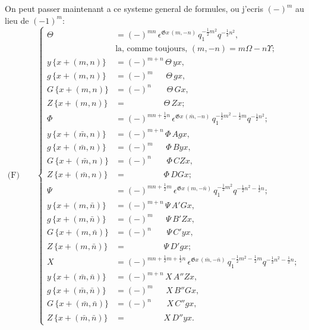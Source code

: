\documentclass[11pt,a4paper]{article}
\begin{document}
On peut passer maintenant a ce systeme general de formules, ou j'ecris $(-)^m$ au
lieu de $(-1)^m$:
\begin{equation*}
\text{(F)}\qquad
\left\{
\begin{aligned}
\Theta &= (-)^{mn}\, \epsilon^{\mathfrak{G}x\, (m, -n)}\, q_1^{-\frac{1}{2}m^2} q^{-\frac{1}{2}n^2},\\
&\text{la, comme toujours, } (m, -n) = m\Omega - n\Upsilon;\\
y\, \{x + (m, n)\} &= (-)^{m+n}\, \Theta\, yx,\\
g\, \{x + (m, n)\} &= (-)^m \phantom{+n}\, \Theta\, gx,\\
G\, \{x + (m, n)\} &= (-)^n \phantom{+m}\, \Theta\, Gx,\\
Z\, \{x + (m, n)\} &= \phantom{(-)^{m+n}} \Theta\, Zx;\\
\Phi &= (-)^{mn+\frac{1}{2}n}\, \epsilon^{\mathfrak{G}x\, (\bar{m}, -n)}\, q_1^{-\frac{1}{2}m^2 - \frac{1}{2}m} q^{-\frac{1}{2}n^2};\\
y\, \{x + (\bar{m}, n)\} &= (-)^{m+n}\, \Phi\, Agx,\\
g\, \{x + (\bar{m}, n)\} &= (-)^m \phantom{+n}\, \Phi\, Byx,\\
G\, \{x + (\bar{m}, n)\} &= (-)^n \phantom{+m}\, \Phi\, CZx,\\
Z\, \{x + (\bar{m}, n)\} &= \phantom{(-)^{m+n}} \Phi\, DGx;\\
\Psi &= (-)^{mn+\frac{1}{2}m}\, \epsilon^{\mathfrak{G}x\, (m, -\bar{n})}\, q_1^{-\frac{1}{2}m^2} q^{-\frac{1}{2}n^2 - \frac{1}{2}n};\\
y\, \{x + (m, \bar{n})\} &= (-)^{m+n}\, \Psi\, A'Gx,\\
g\, \{x + (m, \bar{n})\} &= (-)^m \phantom{+n}\, \Psi\, B'Zx,\\
G\, \{x + (m, \bar{n})\} &= (-)^n \phantom{+m}\, \Psi\, C'yx,\\
Z\, \{x + (m, \bar{n})\} &= \phantom{(-)^{m+n}} \Psi\, D'gx;\\
X &= (-)^{mn+\frac{1}{2}m+\frac{1}{2}n}\, \epsilon^{\mathfrak{G}x\, (\bar{m}, -\bar{n})}\, q_1^{-\frac{1}{2}m^2 - \frac{1}{2}m} q^{-\frac{1}{2}n^2 - \frac{1}{2}n};\\
y\, \{x + (\bar{m}, \bar{n})\} &= (-)^{m+n}\, X\, A''Zx,\\
g\, \{x + (\bar{m}, \bar{n})\} &= (-)^m \phantom{+n}\, X\, B''Gx,\\
G\, \{x + (\bar{m}, \bar{n})\} &= (-)^n \phantom{+m}\, X\, C''gx,\\
Z\, \{x + (\bar{m}, \bar{n})\} &= \phantom{(-)^{m+n}} X\, D''yx.
\end{aligned}
\right.
\end{equation*}
\end{document}
